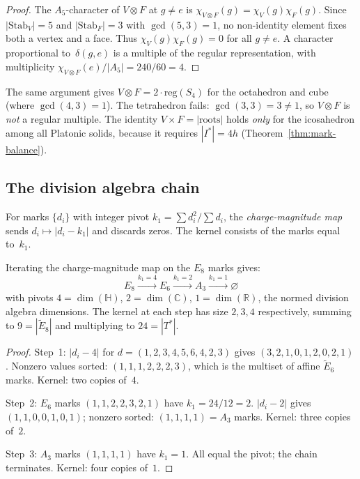 \begin{proof}
The $A_5$-character of $V \otimes F$ at $g \neq e$ is
$\chi_{V \otimes F}(g) = \chi_V(g) \chi_F(g)$.
Since $|\mathrm{Stab}_V| = 5$ and $|\mathrm{Stab}_F| = 3$
with $\gcd(5,3) = 1$, no non-identity element fixes both a vertex
and a face.  Thus $\chi_V(g) \chi_F(g) = 0$ for all $g \neq e$.
A character proportional to~$\delta(g,e)$ is a multiple of the
regular representation, with multiplicity
$\chi_{V \otimes F}(e)/|A_5| = 240/60 = 4$.
\end{proof}

\begin{remark}
The same argument gives $V \otimes F = 2 \cdot \mathrm{reg}(S_4)$
for the octahedron and cube (where $\gcd(4,3)=1$).
The tetrahedron fails: $\gcd(3,3) = 3 \neq 1$,
so $V \otimes F$ is \emph{not} a regular multiple.
The identity $V \times F = |\text{roots}|$ holds \emph{only} for
the icosahedron among all Platonic solids, because it requires
$|I^*| = 4h$ (Theorem~\ref{thm:mark-balance}).
\end{remark}

\subsection{The division algebra chain}
\label{sec:division-algebra-chain}

\begin{definition}
For marks $\{d_i\}$ with integer pivot $k_1 = \sum d_i^2/\sum d_i$,
the \emph{charge-magnitude map} sends $d_i \mapsto |d_i - k_1|$
and discards zeros.  The kernel consists of the marks equal to~$k_1$.
\end{definition}

\begin{theorem}\label{thm:division-chain}
Iterating the charge-magnitude map on the $E_8$ marks gives:
\[
  E_8 \xrightarrow{k_1=4} E_6 \xrightarrow{k_1=2} A_3 \xrightarrow{k_1=1} \varnothing
\]
with pivots $4 = \dim(\mathbb{H})$, $2 = \dim(\mathbb{C})$,
$1 = \dim(\mathbb{R})$, the normed division algebra dimensions.
The kernel at each step has size $2, 3, 4$ respectively,
summing to $9 = |\tilde{E}_8|$ and multiplying to $24 = |T^*|$.
\end{theorem}

\begin{proof}
Step~1: $|d_i - 4|$ for $d = (1,2,3,4,5,6,4,2,3)$ gives
$(3,2,1,0,1,2,0,2,1)$.  Nonzero values sorted:
$(1,1,1,2,2,2,3)$, which is the multiset of affine $\tilde{E}_6$ marks.  Kernel: two copies of~$4$.

Step~2: $E_6$ marks $(1,1,2,2,3,2,1)$ have $k_1 = 24/12 = 2$.
$|d_i - 2|$ gives $(1,1,0,0,1,0,1)$; nonzero sorted: $(1,1,1,1) = A_3$ marks.
Kernel: three copies of~$2$.

Step~3: $A_3$ marks $(1,1,1,1)$ have $k_1 = 1$.  All equal the pivot;
the chain terminates.  Kernel: four copies of~$1$.
\end{proof}

